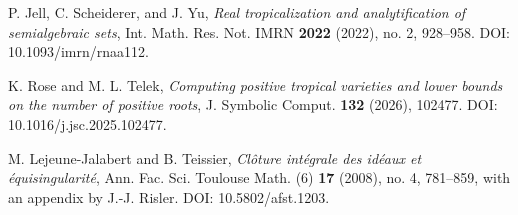 P. Jell, C. Scheiderer, and J. Yu,
\emph{Real tropicalization and analytification of semialgebraic sets},
Int. Math. Res. Not. IMRN \textbf{2022} (2022), no. 2, 928--958.
DOI: 10.1093/imrn/rnaa112.

K. Rose and M. L. Telek,
\emph{Computing positive tropical varieties and lower bounds on the number
of positive roots}, J. Symbolic Comput. \textbf{132} (2026), 102477.
DOI: 10.1016/j.jsc.2025.102477.

M. Lejeune-Jalabert and B. Teissier,
\emph{Cl\^oture int\'egrale des id\'eaux et \'equisingularit\'e},
Ann. Fac. Sci. Toulouse Math. (6) \textbf{17} (2008), no. 4, 781--859,
with an appendix by J.-J. Risler.
DOI: 10.5802/afst.1203.
